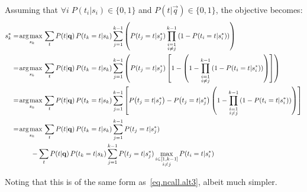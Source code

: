\noindent
Assuming that $\forall i \; P(t_i|s_i) \in \{0,1\}$ and $P(t|\vec{q}) \in \{0,1\}$, the objective becomes:
\begin{align}
  s_k^* & = \argmax_{s_k} \sum_t P(t|\vec{q}) \, P(t_k = t | s_k) \sum_{j=1}^{k-1} \left( P(t_j=t|s_j^*) \prod_{\substack{i=1 \\ i \neq j}}^{k-1} \left( 1 - P \! \left( t_i=t|s_i^* \right) \right) \right) \nonumber \\
  & = \argmax_{s_k} \sum_t P(t|\vec{q}) \, P(t_k = t | s_k) \sum_{j=1}^{k-1} \left( P(t_j=t|s_j^*) \left[ 1 - \left( 1 - \prod_{\substack{i=1 \\ i \neq j}}^{k-1} \left( 1 - P \! \left( t_i=t|s_i^* \right) \right) \right) \right] \right) \nonumber \\
  & = \argmax_{s_k} \sum_t P(t|\vec{q}) \, P(t_k = t | s_k) \sum_{j=1}^{k-1} \left[ P \! \left( t_j=t|s_j^* \right) - P \! \left( t_j=t|s_j^* \right) \left( 1 - \prod_{\substack{i=1 \\ i \neq j}}^{k-1} \left( 1 - P \! \left( t_i=t|s_i^* \right) \right) \right) \right] \nonumber \\
  & = \argmax_{s_k} \sum_t P(t|\vec{q}) \, P(t_k = t | s_k) \sum_{j=1}^{k-1} P(t_j=t|s_j^*) \nonumber \\
  & \hspace{10mm} - \sum_t P(t|\vec{q}) \, P(t_k = t | s_k) \sum_{j=1}^{k-1} P(t_j=t|s_j^*) \max_{\substack{ i \in [1, k-1] \\ i \neq j}} P(t_i=t|s_i^*) \nonumber
\end{align}

\noindent
Noting that this is of the same form as~\eqref{eq.ncall.alt3}, albeit much simpler.



